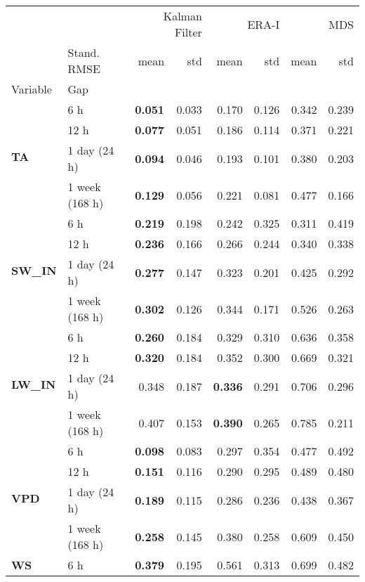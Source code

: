 \begin{table}
\centering
\caption{\CapTheTableStand}
\label{tbl:the_table_stand}
\begin{tabular}{p{2.1cm}l|rr|rr|rr}
\toprule
 &  & \multicolumn{2}{r}{Kalman Filter} & \multicolumn{2}{r}{ERA-I} & \multicolumn{2}{r}{MDS} \\
 & Stand. RMSE & mean & std & mean & std & mean & std \\
Variable & Gap &  &  &  &  &  &  \\
\midrule
\multirow[c]{4}{*}{\textbf{TA}} & 6 h & \bfseries 0.051 & 0.033 & 0.170 & 0.126 & 0.342 & 0.239 \\
 & 12 h & \bfseries 0.077 & 0.051 & 0.186 & 0.114 & 0.371 & 0.221 \\
 & 1 day (24 h) & \bfseries 0.094 & 0.046 & 0.193 & 0.101 & 0.380 & 0.203 \\
 & 1 week (168 h) & \bfseries 0.129 & 0.056 & 0.221 & 0.081 & 0.477 & 0.166 \\
\cline{1-8}
\multirow[c]{4}{*}{\textbf{SW\_IN}} & 6 h & \bfseries 0.219 & 0.198 & 0.242 & 0.325 & 0.311 & 0.419 \\
 & 12 h & \bfseries 0.236 & 0.166 & 0.266 & 0.244 & 0.340 & 0.338 \\
 & 1 day (24 h) & \bfseries 0.277 & 0.147 & 0.323 & 0.201 & 0.425 & 0.292 \\
 & 1 week (168 h) & \bfseries 0.302 & 0.126 & 0.344 & 0.171 & 0.526 & 0.263 \\
\cline{1-8}
\multirow[c]{4}{*}{\textbf{LW\_IN}} & 6 h & \bfseries 0.260 & 0.184 & 0.329 & 0.310 & 0.636 & 0.358 \\
 & 12 h & \bfseries 0.320 & 0.184 & 0.352 & 0.300 & 0.669 & 0.321 \\
 & 1 day (24 h) & 0.348 & 0.187 & \bfseries 0.336 & 0.291 & 0.706 & 0.296 \\
 & 1 week (168 h) & 0.407 & 0.153 & \bfseries 0.390 & 0.265 & 0.785 & 0.211 \\
\cline{1-8}
\multirow[c]{4}{*}{\textbf{VPD}} & 6 h & \bfseries 0.098 & 0.083 & 0.297 & 0.354 & 0.477 & 0.492 \\
 & 12 h & \bfseries 0.151 & 0.116 & 0.290 & 0.295 & 0.489 & 0.480 \\
 & 1 day (24 h) & \bfseries 0.189 & 0.115 & 0.286 & 0.236 & 0.438 & 0.367 \\
 & 1 week (168 h) & \bfseries 0.258 & 0.145 & 0.380 & 0.258 & 0.609 & 0.450 \\
\cline{1-8}
\multirow[c]{4}{*}{\textbf{WS}} & 6 h & \bfseries 0.379 & 0.195 & 0.561 & 0.313 & 0.699 & 0.482 \\

\end{tabular}
\end{table}
